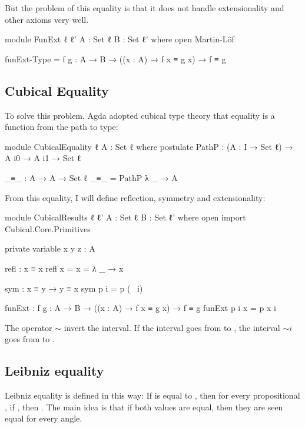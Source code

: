 \documentclass{article}
\begin{document}
But the problem of this equality is that it does not handle extensionality and other axioms very well.

\begin{code}
module FunExt {ℓ ℓ'} {A : Set ℓ} {B : Set ℓ'} where
  open Martin-Löf

  funExt-Type = {f g : A → B}
    → ((x : A) → f x ≡ g x) → f ≡ g
\end{code}

\subsection{Cubical Equality}

To solve this problem, Agda adopted cubical type theory that equality is a function from the path to type:

\begin{code}
module CubicalEquality {ℓ} {A : Set ℓ} where
  postulate
    PathP : (A : I → Set ℓ) → A i0 → A i1 → Set ℓ

  _≡_ : A → A → Set ℓ
  _≡_ = PathP λ _ → A
\end{code}

From this equality, I will define reflection, symmetry and extensionality:

\begin{code}
module CubicalResults {ℓ ℓ'} {A : Set ℓ} {B : Set ℓ'} where
  open import Cubical.Core.Primitives

  private variable
    x y z : A

  refl : x ≡ x
  refl {x = x} = λ _ → x

  sym : x ≡ y → y ≡ x
  sym p i = p (~ i)

  funExt : {f g : A → B}
    → ((x : A) → f x ≡ g x) → f ≡ g
  funExt p i x = p x i
\end{code}

The operator $\sim$ invert the interval. If the interval  goes from
 to , the interval $\sim i$ goes from  to .

\subsection{Leibniz equality}

Leibniz equality is defined in this way:
If  is equal to , then for every propositional , if ,
then .
The main idea is that if both values are equal, then they are seen equal for every angle.
\end{document}
